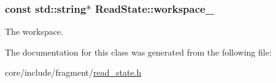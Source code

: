 \subsubsection[{workspace\+\_\+}]{\setlength{\rightskip}{0pt plus 5cm}const std\+::string$\ast$ Read\+State\+::workspace\+\_\+\hspace{0.3cm}{\ttfamily [private]}}\label{classReadState_a575195a908596181416a7ea0c5b45eeb}
The workspace. 

The documentation for this class was generated from the following file\+:\begin{DoxyCompactItemize}
\item 
core/include/fragment/\hyperlink{read__state_8h}{read\+\_\+state.\+h}\end{DoxyCompactItemize}
